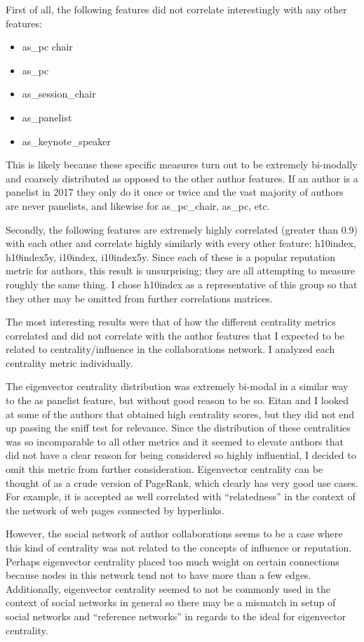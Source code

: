 \documentclass{article}
\begin{document}
First of all, the following features did not correlate interestingly with any other features:
\begin{itemize}
\item as\_pc chair
\item as\_pc
\item as\_session\_chair
\item as\_panelist
\item as\_keynote\_speaker
\end{itemize}
This is likely because these specific measures turn out to be extremely bi-modally and coarsely distributed as opposed to the other author features.
If an author is a panelist in 2017 they only do it once or twice and the vast majority of authors are never panelists, and likewise for as\_pc\_chair, as\_pc, etc.

Secondly, the following features are extremely highly correlated (greater than 0.9) with each other and correlate highly similarly with every other feature: h10index, h10index5y, i10index, i10index5y.
Since each of these is a popular reputation metric for authors, this result is unsurprising; they are all attempting to measure roughly the same thing.
I chose h10index as a representative of this group so that they other may be omitted from further correlations matrices.

The most interesting results were that of how the different centrality metrics correlated and did not correlate with the author features that I expected to be related to centrality/influence in the collaborations network.
I analyzed each centrality metric individually.

The eigenvector centrality distribution was extremely bi-modal in a similar way to the as panelist feature, but without good reason to be so.
Eitan and I looked at some of the authors that obtained high centrality scores, but they did not end up passing the sniff test for relevance.
Since the distribution of these centralities was so incomparable to all other metrics and it seemed to elevate authors that did not have a clear reason for being considered so highly influential, I decided to omit this metric from further consideration.
Eigenvector centrality can be thought of as a crude version of PageRank, which clearly has very good use cases.
For example, it is accepted as well correlated with ``relatedness'' in the context of the network of web pages connected by hyperlinks.

However, the social network of author collaborations seems to be a case where this kind of centrality was not related to the concepts of influence or reputation.
Perhaps eigenvector centrality placed too much weight on certain connections because nodes in this network tend not to have more than a few edges.
Additionally, eigenvector centrality seemed to not be commonly used in the context of social networks in general so there may be a mismatch in setup of social networks and ``reference networks'' in regards to the ideal for eigenvector centrality.
\end{document}
